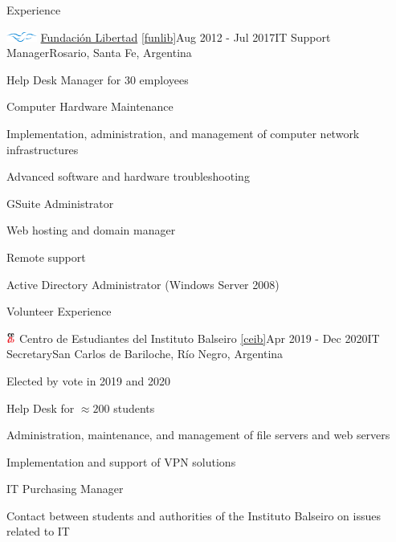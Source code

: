 \documentclass{resume} %
\begin{document}
\begin{rSection}{Experience}
    \begin{rSubsection}{\includegraphics[height=0.3cm]{images/fl.png} \href{https://libertad.org.ar/}{Fundación Libertad} \ref{funlib}}{Aug 2012 - Jul 2017}{IT Support Manager}{Rosario, Santa Fe, Argentina}
        \item Help Desk Manager for 30 employees
        \item Computer Hardware Maintenance
        \item Implementation, administration, and management of computer network infrastructures
        \item Advanced software and hardware troubleshooting
        \item GSuite Administrator
        \item Web hosting and domain manager
        \item Remote support
        \item Active Directory Administrator (Windows Server 2008)
    \end{rSubsection}


\end{rSection}


\begin{rSection}{Volunteer Experience}
    \begin{rSubsection}{\includegraphics[height=0.3cm]{images/ceib.png} Centro de Estudiantes del Instituto Balseiro \ref{ceib}}{Apr 2019 - Dec 2020}{IT Secretary}{San Carlos de Bariloche, Río Negro, Argentina}
        \item Elected by vote in 2019 and 2020
        \item Help Desk for $\approx 200$ students
        \item Administration, maintenance, and management of file servers and web servers
        \item Implementation and support of VPN solutions
        \item IT Purchasing Manager
        \item Contact between students and authorities of the Instituto Balseiro on issues related to IT
    \end{rSubsection}


\end{rSection}
\end{document}
